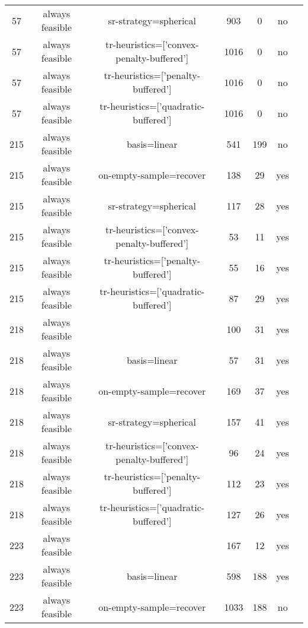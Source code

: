 \begin{scriptsize}
\begin{center}
\begin{longtable}{ccccccc}
 57 & always feasible &                     sr-strategy=spherical &    903 &      0 &      no\\
 57 & always feasible & tr-heuristics=['convex-penalty-buffered'] &   1016 &      0 &      no\\
 57 & always feasible &        tr-heuristics=['penalty-buffered'] &   1016 &      0 &      no\\
 57 & always feasible &      tr-heuristics=['quadratic-buffered'] &   1016 &      0 &      no\\
215 & always feasible &                              basis=linear &    541 &    199 &      no\\
215 & always feasible &                   on-empty-sample=recover &    138 &     29 &     yes\\
215 & always feasible &                     sr-strategy=spherical &    117 &     28 &     yes\\
215 & always feasible & tr-heuristics=['convex-penalty-buffered'] &     53 &     11 &     yes\\
215 & always feasible &        tr-heuristics=['penalty-buffered'] &     55 &     16 &     yes\\
215 & always feasible &      tr-heuristics=['quadratic-buffered'] &     87 &     29 &     yes\\
218 & always feasible &                                           &    100 &     31 &     yes\\
218 & always feasible &                              basis=linear &     57 &     31 &     yes\\
218 & always feasible &                   on-empty-sample=recover &    169 &     37 &     yes\\
218 & always feasible &                     sr-strategy=spherical &    157 &     41 &     yes\\
218 & always feasible & tr-heuristics=['convex-penalty-buffered'] &     96 &     24 &     yes\\
218 & always feasible &        tr-heuristics=['penalty-buffered'] &    112 &     23 &     yes\\
218 & always feasible &      tr-heuristics=['quadratic-buffered'] &    127 &     26 &     yes\\
223 & always feasible &                                           &    167 &     12 &     yes\\
223 & always feasible &                              basis=linear &    598 &    188 &     yes\\
223 & always feasible &                   on-empty-sample=recover &   1033 &    188 &      no\\

\end{longtable}
\end{center}
\end{scriptsize}
